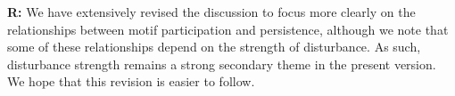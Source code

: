 \documentclass[12pt]{article}
\begin{document}
\begin{enumerate}
                \textbf{R:} We have extensively revised the discussion to focus more clearly on the relationships between motif participation and persistence, although we note that some of these relationships depend on the strength of disturbance. As such, disturbance strength remains a strong secondary theme in the present version. We hope that this revision is easier to follow.


        \end{enumerate}

\clearpage

     
\end{document}
